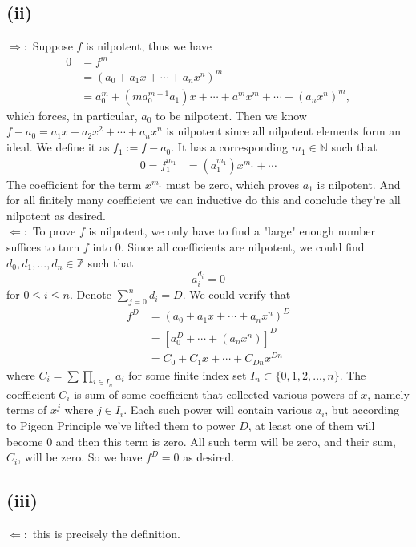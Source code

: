 \subsection{(ii)} $\Rightarrow:$ Suppose $f$ is nilpotent, thus we have 
    \begin{align*}
        0&=f^m\\
        &=(a_0+a_1x+\cdots+a_nx^n)^m\\
        &=a_0^m+(ma_0^{m-1}a_1)x+\cdots+a_1^mx^m+\cdots+(a_nx^n)^m,
    \end{align*}which forces, in particular, $a_0$ to be nilpotent. 
    Then we know $f-a_0=a_1x+a_2x^2+\cdots+a_nx^n$ is nilpotent since all nilpotent elements form an ideal. We define it as $f_1:=f-a_0$. It has a corresponding $m_1\in \mathbb{N}$ such that 
    \begin{align*}
        0=f_1^{m_1}&=(a_1^{m_1})x^{m_1}+\cdots
    \end{align*}The coefficient for the term $x^{m_1}$ must be zero, which proves $a_1$ is nilpotent. And for all finitely many coefficient we can inductive do this and conclude they're all nilpotent as desired.\\
    
    \noindent $\Leftarrow:$ To prove $f$ is nilpotent, we only have to find a "large" enough number suffices to turn $f$ into $0$. Since all coefficients are nilpotent, we could find $d_0, d_1,..., d_n\in\mathbb Z$ such that 
    $$a_i^{d_i}=0$$ for $0\leq i\leq n$.
    Denote $\sum_{j=0}^{n} d_i = D$.
    We could verify that 
    \begin{align*}
        f^D&=(a_0+a_1x+\cdots+a_nx^n)^D\\
        &=[a_0^D+\cdots +(a_nx^n)]^D\\
        &=C_0+C_1x+\cdots+C_{Dn}x^{Dn}
    \end{align*}
    where $C_i=\sum \prod_{i\in I_n} a_i$ for some finite index set $I_n\subset \{0,1,2,...,n\}$. The coefficient $C_i$ is sum of some coefficient that collected various powers of $x$, namely terms of $x^j$ where $j\in I_i$. Each such power will contain various $a_i$, but according to Pigeon Principle we've lifted them to power $D$, at least one of them will become $0$ and then this term is zero. All such term will be zero, and their sum, $C_i$, will be zero. So we have $f^D=0$ as desired.

\subsection{(iii)} 
$\Leftarrow:$ this is precisely the definition.\\

